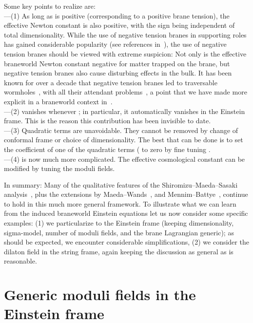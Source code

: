 \documentclass[a4paper,10pt]{article}
\begin{document}
{Some key points to realize are: 
\\
---(1) As long as \myHighlight{$\lambda$}\coordHE{} is positive (corresponding to a positive
brane tension), the effective Newton constant \coordHE{} is also
positive, with the sign being independent of total
dimensionality. While the use of negative tension branes in supporting
roles has gained considerable popularity (see references
in~\cite{void}), the use of negative tension branes should be viewed
with extreme suspicion: Not only is the effective braneworld Newton
constant negative for matter trapped on the brane, but negative
tension branes also cause disturbing effects in the bulk. It has been
known for over a decade that negative tension branes led to
traversable wormholes~\cite{surgery}, with all their attendant
problems~\cite{book}, a point that we have made more explicit in a
braneworld context in~\cite{void}.
\\
---(2) \coordHE{} vanishes whenever \coordHE{}; in particular,
it automatically vanishes in the Einstein frame. This is the reason
this contribution has been invisible to date.
\\
---(3) Quadratic terms are unavoidable. They cannot be removed by
change of conformal frame or choice of dimensionality. The best that
can be done is to set the coefficient of one of the quadratic terms
(\coordHE{} to zero by fine tuning \coordHE{}.
\\ 
---(4) \myHighlight{$\Lambda_\effective$}\coordHE{} is now much more complicated. The effective
cosmological constant can be modified by tuning the moduli fields.

In summary: Many of the qualitative features of the
Shiromizu--Maeda--Sasaki analysis~\cite{Shiromizu}, plus the
extensions by Maeda--Wands~\cite{Wands}, and
Mennim--Battye~\cite{Mennim}, continue to hold in this much more
general framework.  To illustrate what we can learn from the induced
braneworld Einstein equations let us now consider some specific
examples: (1) we particularize to the Einstein frame (keeping
dimensionality, sigma-model, number of moduli fields, and the brane
Lagrangian generic); as should be expected, we encounter considerable
simplifications, (2) we consider the dilaton field in the string
frame, again keeping the discussion as general as is reasonable.

\section{Generic moduli fields in the Einstein frame}
\setcounter{equation}{0}

}
\end{document}
